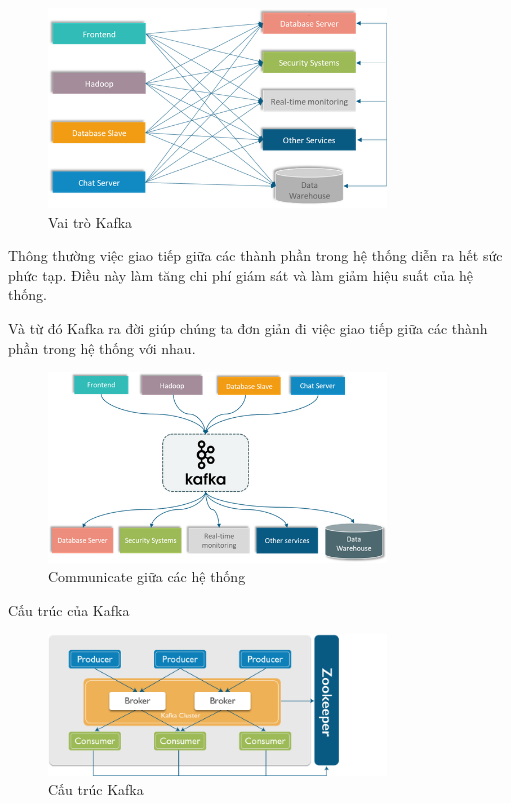 \begin{itemize}
            \begin{figure}[!ht]   			\includegraphics[width=0.8\textwidth]{Images/Kafka1.png}
    		\centering
    		\linebreak
    		\caption{Vai trò Kafka}
            \end{figure}
            
            Thông thường việc giao tiếp giữa các thành phần trong hệ thống diễn ra hết sức phức tạp. Điều này làm tăng chi phí giám sát và làm giảm hiệu suất của hệ thống.
            
            Và từ đó Kafka ra đời giúp chúng ta đơn giản đi việc giao tiếp giữa các thành phần trong hệ thống với nhau.
            
             \begin{figure}[!ht]   			\includegraphics[width=0.8\textwidth]{Images/Kafka3.png}
    		\centering
    		\linebreak
    		\caption{Communicate giữa các hệ thống}
            \end{figure}
            
            Cấu trúc của Kafka
            
             \begin{figure}[!ht]   			\includegraphics[width=0.8\textwidth]{Images/Kafka2.png}
    		\centering
    		\linebreak
    		\caption{Cấu trúc Kafka}
            \end{figure}
            

\end{itemize}
